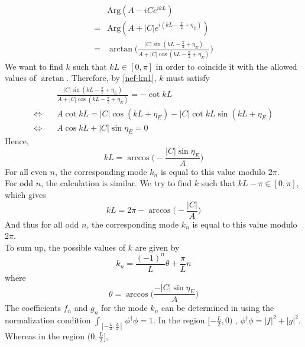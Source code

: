 \begin{equation}
\begin{split}
&\textrm{Arg}(A - iC e^{ikL}) \\
= &\textrm{Arg}(A + |C| e^{i(kL - \frac{\pi}{2} + \eta_E)}) \\
= & \arctan \bigg( \frac{|C| \sin(kL - \frac{\pi}{2} + \eta_E)}{A + | C| \cos(kL - \frac{\pi}{2} + \eta_E) }\bigg)
\end{split}
\end{equation}
We want to find $k$ such that $kL \in [0, \pi]$ in order to coincide it with the allowed values of $\arctan$.
Therefore, by \cref{nef-kn1}, $k$ must satisfy
\begin{equation}\label{nef-arctan}
\begin{split}
& \frac{|C| \sin(kL - \frac{\pi}{2} + \eta_E)}{A + | C| \cos(kL - \frac{\pi}{2} + \eta_E) } =  - \cot kL  \\
\Leftrightarrow \quad & A \cot kL = |C| \cos(kL + \eta_E) - |C| \cot kL \sin(kL + \eta_E)  \\
%
\Leftrightarrow\quad &
A \cos kL + |C| \sin\eta_E= 0
\end{split}
\end{equation}
Hence,
\begin{equation*}
kL = \arccos \big(-\frac{|C|\sin\eta_E}{A}\big)
\end{equation*}
For all even $n$, the corresponding mode $k_n$ is equal to this value modulo $2 \pi$. \\
For odd $n$, the calculation is similar.
We try to find $k$ such that $kL - \pi \in [0, \pi]$, which gives 
\begin{equation*}
kL = 2\pi - \arccos \big(-\frac{|C|}{A}\big)
\end{equation*} 
And thus for all odd $n$, the corresponding mode $k_n$ is equal to this value modulo $2 \pi$.\\
To sum up, the possible values of $k$ are given by
\begin{equation*}
k_{n} = \frac{(-1)^n}{L}\theta  + \frac{\pi}{L}n 
\end{equation*}
where
\begin{equation*}
\theta = \arccos\bigg( \frac{-|C| \sin \eta_E}{A} \bigg)
\end{equation*}
The coefficients $f_{n}$ and $g_{n}$ for the mode $k_{ n}$ can be determined in using the normalization condition  $\int_{[-\frac{L}{2}, \frac{L}{2}]}\phi^\dagger \phi = 1$. 
In the region $[-\frac{L}{2}, 0)$ , $\phi^\dagger \phi = | f |^2 + | g |^2$. Whereas in the region $(0, \frac{L}{2}]$, 
